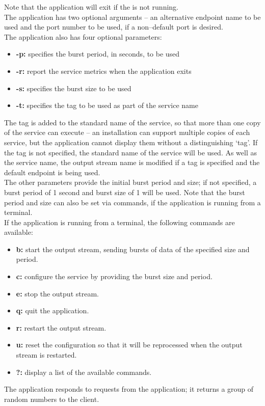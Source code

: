 Note that the application will exit if the
 is not running.\\

The application has two optional arguments -- an alternative endpoint name to be used and
the port number to be used, if a non--default port is desired.\\

The application also has four optional parameters:
\begin{itemize}
\item \textbf{-p:} specifies the burst period, in seconds, to be used 
\item \textbf{-r:} report the service metrics when the application exits
\item \textbf{-s:} specifies the burst size to be used
\item \textbf{-t:} specifies the tag to be used as part of the service name
\end{itemize}
The tag is added to the standard name of the service, so that more than one copy of the
service can execute -- an \mplusm{} installation can support multiple copies of each
 service, but the 
application cannot display them without a distinguishing `tag'.
If the tag is not specified, the standard name of the service will be used.
As well as the service name, the output stream name is modified if a tag is specified and
the default endpoint is being used.\\

The other parameters provide the initial burst period and size; if not specified, a burst
period of 1 second and burst size of 1 will be used.
Note that the burst period and size can also be set via commands, if the application is
running from a terminal.\\

If the application is running from a terminal, the following commands are available:
\begin{itemize}
\item \textbf{b:} start the output stream, sending bursts of data of the specified size
and period. 
\item \textbf{c:} configure the service by providing the burst size and period. 
\item \textbf{e:} stop the output stream. 
\item \textbf{q:} quit the application. 
\item \textbf{r:} restart the output stream. 
\item \textbf{u:} reset the configuration so that it will be reprocessed when the output
stream is restarted. 
\item \textbf{?:} display a list of the available commands.
\end{itemize}
The  application responds to
 requests from the
 application; it returns a group of random
numbers to the client.\\

